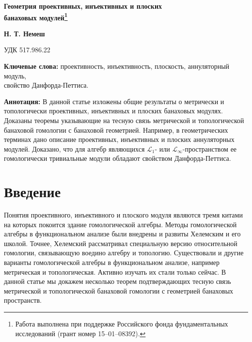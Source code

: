 \documentclass[12pt]{article}
\begin{document}
\begin{flushleft}
    \Large \textbf{Геометрия проективных, инъективных и плоских\\ банаховых
        модулей\footnote{Работа выполнена при поддержке Российского фонда
            фундаментальных исследований (грант номер 15--01--08392).}}\\[0.5cm]
\end{flushleft}
\begin{flushright}
    \normalsize \textbf{Н. Т. Немеш}\\[0.5cm]
\end{flushright}
\begin{flushleft}
    \small {УДК 517.986.22}\\[0.5cm]
\end{flushleft}

\thispagestyle{empty}

\textbf{Ключевые слова:} проективность, инъективность, плоскость, аннуляторный
модуль,\\ свойство Данфорда-Петтиса.
\medskip

\textbf{Аннотация:} В данной статье изложены общие результаты о метрически и
топологически проективных, инъективных и плоских банаховых модулях. Доказаны
теоремы указывающие на тесную связь метрической и топологической банаховой
гомологии с банаховой геометрией. Например, в геометрических терминах дано
описание проективных, инъективных и плоских аннуляторных модулей. Доказано, что
для алгебр являющихся  $\mathscr{L}_1$- или $\mathscr{L}_\infty$-пространством
ее гомологически тривиальные модули обладают свойством Данфорда-Петтиса.
\medskip


\section{Введение}\label{SectionIntroduction}

Понятия проективного, инъективного и плоского модуля являются тремя китами на
которых покоится здание гомологической алгебры. Методы гомологической алгебры в
функциональном анализе были внедрены и развиты Хелемским и его школой. Точнее,
Хелемский рассматривал специальную версию относительной гомологии, связывающую
воедино алгебру и топологию. Существовали и другие варианты гомологической
алгебры в функциональном анализе, например метрическая и топологическая. Активно
изучать их стали только сейчас. В данной статье мы докажем несколько теорем
подтверждающих тесную связь метрической и топологической банаховой гомологии с
геометрией банаховых пространств.
\end{document}
